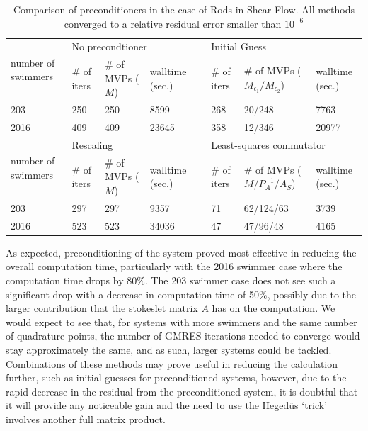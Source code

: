 \begin{table}
\begin{singlespace}
\centering
\setlength{\tabcolsep}{6pt}
\renewcommand{\arraystretch}{1.4}
\caption{Comparison of preconditioners in the case of Rods in Shear Flow. All methods converged to a relative residual error smaller than $10^{-6}$}
\small
\begin{tabular}{p{2cm} p{1cm} p{2cm} p{1.5cm} p{0.1cm} p{1cm} p{2cm} p{1.5cm}}
\multirow{2}{*}{\parbox{1.8cm}{number of swimmers}} & \multicolumn{3}{l}{No precondtioner} & & \multicolumn{3}{l}{Initial Guess} \\ \cline{2-4} \cline{6-8}
  & \# of iters & \# of MVPs ($M$) & walltime (sec.) & & \# of iters & \# of MVPs ($M_{\epsilon_1}/M_{\epsilon_2}$) & walltime (sec.) \\ \hline
  203 & 250 & 250 & 8599 & &  268 & 20/248 & 7763\\
  2016 & 409 & 409 & 23645 & & 358 & 12/346 & 20977\\ \hline
  \multirow{2}{*}{\parbox{1.8cm}{number of swimmers}} & \multicolumn{3}{l}{Rescaling} & &\multicolumn{3}{l}{Least-squares commutator} \\ \cline{2-4} \cline{6-8}
  & \# of iters & \# of MVPs ($M$) & walltime (sec.) & & \# of iters & \# of MVPs ($M/P_A^{-1}/A_S$) & walltime (sec.) \\ \hline
  203 & 297 & 297 & 9357 & & 71 & 62/124/63 & 3739 \\
  2016 & 523 & 523 & 34036 & & 47 & 47/96/48 & 4165 
\end{tabular}
\label{tab:Preconditioning}
\end{singlespace}
\end{table}

As expected, preconditioning of the system proved most effective in reducing the overall computation time, particularly with the 2016 swimmer case where the computation time drops by 80\%. The 203 swimmer case does not see such a significant drop with a decrease in computation time of 50\%, possibly due to the larger contribution that the stokeslet matrix $A$ has on the computation. We would expect to see that, for systems with more swimmers and the same number of quadrature points, the number of GMRES iterations needed to converge would stay approximately the same, and as such, larger systems could be tackled. Combinations of these methods may prove useful in reducing the calculation further, such as initial guesses for preconditioned systems, however, due to the rapid decrease in the residual from the preconditioned system, it is doubtful that it will provide any noticeable gain and the need to use the Heged{\"u}s `trick' involves another full matrix product.

